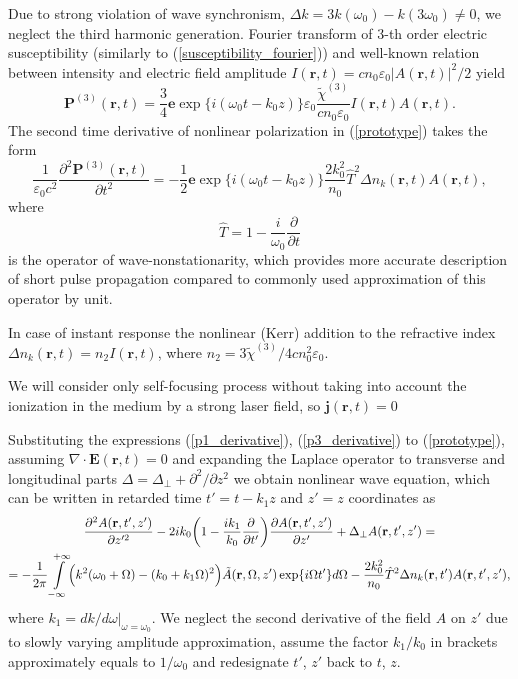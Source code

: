 \documentclass[a4paper, 12pt]{article}
\begin{document}
Due to strong violation of wave synchronism, $\Delta k = 3 k (\omega_0) - k(3 \omega_0) \ne 0$, we neglect the third harmonic generation. Fourier transform of 3-th order electric susceptibility (similarly to (\ref{susceptibility_fourier})) and well-known relation between intensity and electric field amplitude  $I(\mathbf{r}, t) = c n_0 \varepsilon_0 |A(\mathbf{r}, t)|^2 \bigl/ 2$ yield
\begin{equation}
\mathbf{P}^{(3)}(\mathbf{r}, t) = \frac{3}{4} \mathbf{e} \exp \{ i (\omega_0 t - k_0 z) \} \varepsilon_0 \frac{\tilde{\chi}^{(3)}}{c n_0 \varepsilon_0} I(\mathbf{r}, t) A(\mathbf{r}, t).
\end{equation}
The second time derivative of nonlinear polarization in (\ref{prototype}) takes the form
\begin{equation}
\label{p3_derivative}
\frac1{\varepsilon_0 c^2} \frac{\partial^2 \mathbf{P}^{(3)}(\mathbf{r}, t)}{\partial t^2} = -\frac1{2} \mathbf{e} \exp \{ i (\omega_0 t - k_0 z) \} \frac{2 k_0^2}{n_0} \hat{T}^2 \Delta n_k(\mathbf{r}, t) A(\mathbf{r}, t), 
\end{equation}
where
\begin{equation}
\hat{T} = 1 - \frac{i}{\omega_0} \frac{\partial}{\partial t}
\end{equation}
is the operator of wave-nonstationarity, which provides more accurate description of short pulse propagation compared to commonly used approximation of this operator by unit.

In case of instant response the nonlinear (Kerr) addition to the refractive index $\Delta n_k(\mathbf{r}, t) = n_2 I(\mathbf{r}, t)$, where $n_2 = 3 \tilde{\chi}^{(3)} \bigl/ 4 c n_0^2 \varepsilon_0$.

We will consider only self-focusing process without taking into account the ionization in the medium by a strong laser field, so $\mathbf{j}(\mathbf{r}, t)=0$

Substituting the expressions (\ref{p1_derivative}), (\ref{p3_derivative}) to (\ref{prototype}), assuming $\nabla \cdot \mathbf{E}(\mathbf{r}, t) = 0$ and expanding the Laplace operator to transverse and longitudinal parts $\Delta = \Delta_\perp + \partial^2/\partial z^2$ we obtain nonlinear wave equation, which can be written in retarded time $t'=t-k_1 z$ and $z'=z$ coordinates as
\begin{multline}
\label{equation_without_dissipation}
\frac{\partial^2 A (\mathbf{r}, t', z')}{\partial z'^2} - 2 i k_0  \biggl( 1 - \frac{i k_1}{k_0} \frac{\partial }{\partial t'}  \biggr) \frac{\partial A (\mathbf{r}, t', z')}{\partial z'} + \Delta_{\perp} A (\mathbf{r}, t', z')= \\ =-\frac1{2 \pi} \int\limits_{-\infty}^{+\infty} \Bigl( k^2(\omega_0 + \Omega) - (k_0 + k_1 \Omega)^2 \Bigr) \tilde{A}(\mathbf{r}, \Omega, z') \exp \{ i \Omega t' \} d \Omega - \frac{2 k_0^2}{n_0} \hat{T}^2 \Delta n_k(\mathbf{r}, t') A(\mathbf{r}, t', z'),
\end{multline}
where $k_1 = dk / d\omega |_{\omega=\omega_0}$. We neglect the second derivative of the field $A$ on $z'$ due to slowly varying amplitude approximation, assume the factor $k_1/k_0$ in brackets approximately equals to $1/\omega_0$ and redesignate $t'$, $z'$ back to $t$, $z$. 
\end{document}
